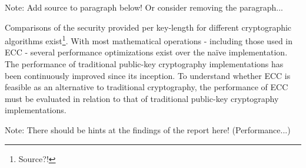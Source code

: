 Note: Add source to paragraph below! Or consider removing the paragraph...

Comparisons of the security provided per key-length for different cryptographic algorithms exist\footnote{Source?!}. With
most mathematical operations - including those used in ECC - several performance optimizations exist over the naïve
implementation. The performance of traditional public-key cryptography implementations has been continuously improved
since its inception. To understand whether ECC is feasible as an alternative to traditional cryptography, the performance
of ECC must be evaluated in relation to that of traditional public-key cryptography implementations.

Note: There should be hints at the findings of the report here! (Performance...)